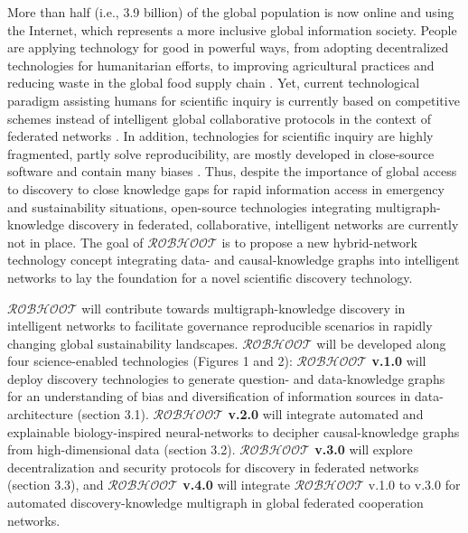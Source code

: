 \documentclass[12pt, a4paper]{article} %
\begin{document}
More than half (i.e., 3.9 billion) of the global population is now
online and using the Internet, which represents a more inclusive
global information society. People are applying technology for good in
powerful ways, from adopting decentralized technologies for
humanitarian efforts, to improving agricultural practices and reducing
waste in the global food supply chain \citep{Wilson2018}. Yet, current
technological paradigm assisting humans for scientific inquiry is
currently based on competitive schemes instead of intelligent global
collaborative protocols in the context of federated networks
\citep{Dilley2016}. In addition, technologies for scientific inquiry
are highly fragmented, partly solve reproducibility, are mostly
developed in close-source software and contain many biases
\citep{Inhaber1977,Ioannidis2005,Fang2011,Gunther2018,Hardwicke2018,Mehrabi2019,Real2020}. Thus,
despite the importance of global access to discovery to close
knowledge gaps for rapid information access in emergency and
sustainability situations, open-source technologies integrating
multigraph-knowledge discovery in federated, collaborative,
intelligent networks are currently not in place. The goal of
$\mathcal{ROBHOOT}$ is to propose a new hybrid-network technology
concept integrating data- and causal-knowledge graphs into intelligent
networks to lay the foundation for a novel scientific discovery
technology.

$\mathcal{ROBHOOT}$ will contribute towards multigraph-knowledge
discovery in intelligent networks to facilitate governance
reproducible scenarios in rapidly changing global sustainability
landscapes. $\mathcal{ROBHOOT}$ will be developed along four
science-enabled technologies (Figures 1 and 2): {\bf
  $\mathcal{ROBHOOT}$ v.1.0} will deploy discovery technologies to
generate question- and data-knowledge graphs for an understanding of
bias and diversification of information sources in data-architecture
(section 3.1). {\bf $\mathcal{ROBHOOT}$ v.2.0} will integrate
automated and explainable biology-inspired neural-networks to decipher
causal-knowledge graphs from high-dimensional data (section 3.2). {\bf
  $\mathcal{ROBHOOT}$ v.3.0} will explore decentralization and
security protocols for discovery in federated networks (section 3.3),
and {\bf $\mathcal{ROBHOOT}$ v.4.0} will integrate $\mathcal{ROBHOOT}$
v.1.0 to v.3.0 for automated discovery-knowledge multigraph in global
federated cooperation networks.
\end{document}
